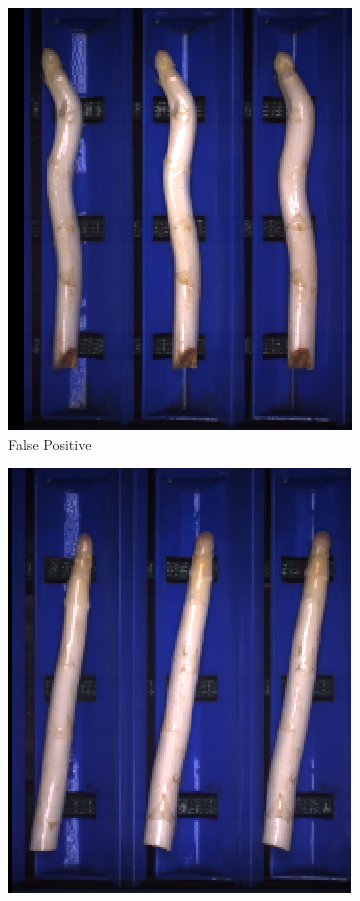 \begin{figure}[h]
	\begin{subfigure}{0.3\textwidth}
		\includegraphics[width=0.9\linewidth]{Figures/appendix/medium_falsepositive_01.png}
		\vspace{-5pt} 
		\caption{False Positive}
	\end{subfigure}
	\begin{subfigure}{0.3\textwidth}
		\includegraphics[width=0.9\linewidth]{Figures/appendix/medium_falsepositive_02.png}

\end{subfigure}
\end{figure}
